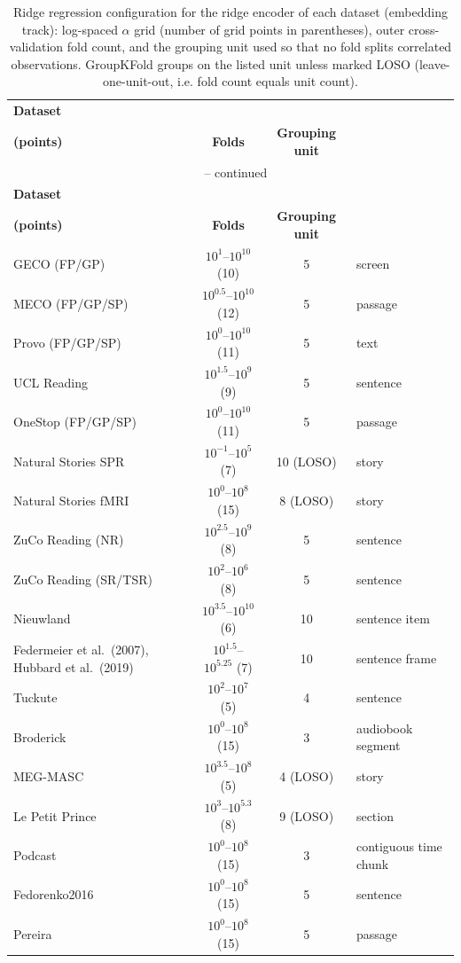 {\setlength{\tabcolsep}{4pt}
\begin{longtable}{@{}p{5.2cm}ccp{2.8cm}@{}}
\caption{Ridge regression configuration for the ridge encoder of each dataset (embedding track): log-spaced $\alpha$ grid (number of grid points in parentheses), outer cross-validation fold count, and the grouping unit used so that no fold splits correlated observations. GroupKFold groups on the listed unit unless marked LOSO (leave-one-unit-out, i.e. fold count equals unit count).}
\label{tab:ridge-config} \\
\toprule
\textbf{Dataset} & \shortstack{\textbf{$\alpha$ grid}\\\textbf{(points)}} & \textbf{Folds} & \textbf{Grouping unit} \\
\midrule
\endfirsthead
\multicolumn{4}{c}{\tablename\ \thetable{} -- continued} \\
\toprule
\textbf{Dataset} & \shortstack{\textbf{$\alpha$ grid}\\\textbf{(points)}} & \textbf{Folds} & \textbf{Grouping unit} \\
\midrule
\endhead
\bottomrule
\endlastfoot
GECO (FP/GP) & $10^{1}$--$10^{10}$ (10) & 5 & screen \\
MECO (FP/GP/SP) & $10^{0.5}$--$10^{10}$ (12) & 5 & passage \\
Provo (FP/GP/SP) & $10^{0}$--$10^{10}$ (11) & 5 & text \\
UCL Reading & $10^{1.5}$--$10^{9}$ (9) & 5 & sentence \\
OneStop (FP/GP/SP) & $10^{0}$--$10^{10}$ (11) & 5 & passage \\
Natural Stories SPR & $10^{-1}$--$10^{5}$ (7) & 10 (LOSO) & story \\
Natural Stories fMRI & $10^{0}$--$10^{8}$ (15) & 8 (LOSO) & story \\
ZuCo Reading (NR) & $10^{2.5}$--$10^{9}$ (8) & 5 & sentence \\
ZuCo Reading (SR/TSR) & $10^{2}$--$10^{6}$ (8) & 5 & sentence \\
Nieuwland & $10^{3.5}$--$10^{10}$ (6) & 10 & sentence item \\
Federmeier et al.\ (2007), Hubbard et al.\ (2019) & $10^{1.5}$--$10^{5.25}$ (7) & 10 & sentence frame \\
Tuckute & $10^{2}$--$10^{7}$ (5) & 4 & sentence \\
Broderick & $10^{0}$--$10^{8}$ (15) & 3 & audiobook segment \\
MEG-MASC & $10^{3.5}$--$10^{8}$ (5) & 4 (LOSO) & story \\
Le Petit Prince & $10^{3}$--$10^{5.3}$ (8) & 9 (LOSO) & section \\
Podcast & $10^{0}$--$10^{8}$ (15) & 3 & contiguous time chunk \\
Fedorenko2016 & $10^{0}$--$10^{8}$ (15) & 5 & sentence \\
Pereira & $10^{0}$--$10^{8}$ (15) & 5 & passage \\
\end{longtable}
}
